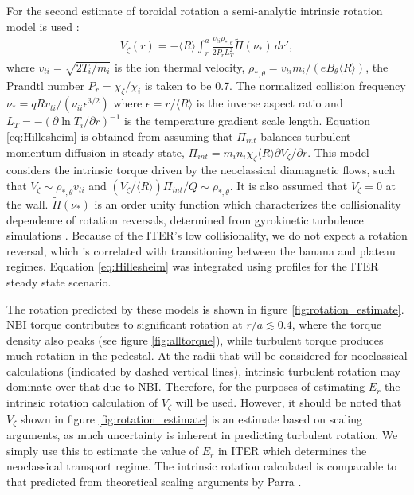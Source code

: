 \documentclass{article}
\numberwithin{figure}{section}
\numberwithin{equation}{section}
\begin{document}
For the second estimate of toroidal rotation a semi-analytic intrinsic rotation model is used \cite{Hillesheim2015}:
\begin{gather}
V_{\zeta}(r) = - \langle R \rangle \int_{r}^a \frac{v_{ti} \rho_{*,\theta}} {2 P_r L_T^2} \widetilde{\Pi} (\nu_*) \, d r',
\label{eq:Hillesheim}
\end{gather} 
where $v_{ti} = \sqrt{2T_i/m_i}$ is the ion thermal velocity, $\rho_{*,\theta} = v_{ti} m_i/(e B_{\theta} \langle R \rangle) $, the Prandtl number $P_r = \chi_{\zeta}/\chi_i$ is taken to be 0.7. The normalized collision frequency $\nu_* = q R v_{ti}/(\nu_{ii} \epsilon^{3/2})$ where $\epsilon = r/\langle R \rangle$ is the inverse aspect ratio and $L_T = - \left( \partial \ln T_i/ \partial r \right)^{-1}$ is the temperature gradient scale length. Equation \ref{eq:Hillesheim} is obtained from assuming that $\Pi_{int}$ balances turbulent momentum diffusion in steady state, $\Pi_{int} = m_i n_i \chi_{\zeta} \langle R \rangle \partial V_{\zeta}/\partial r$. This model considers the intrinsic torque driven by the neoclassical diamagnetic flows, such that $V_{\zeta} \sim \rho_{*,\theta} v_{ti}$ and $(V_{\zeta}/\langle R \rangle) \Pi_{int}/Q \sim \rho_{*, \theta}$. It is also assumed that $V_{\zeta} = 0$ at the wall. %
$\widetilde{\Pi} (\nu_*)$ is an order unity function which characterizes the collisionality dependence of rotation reversals, determined from gyrokinetic turbulence simulations \cite{Barnes2013}. Because of the ITER's low collisionality, we do not expect a rotation reversal, which is correlated with transitioning between the banana and plateau regimes. Equation \ref{eq:Hillesheim} was integrated using profiles for the ITER steady state scenario. 

The rotation predicted by these models is shown in figure \ref{fig:rotation_estimate}. NBI torque contributes to significant rotation at $r/a \lesssim 0.4$, where the torque density also peaks (see figure \ref{fig:alltorque}), while turbulent torque produces much rotation in the pedestal.  At the radii that will be considered for neoclassical calculations (indicated by dashed vertical lines), intrinsic turbulent rotation may dominate over that due to NBI. Therefore, for the purposes of estimating $E_r$ the intrinsic rotation calculation of $V_{\zeta}$ will be used. However, it should be noted that $V_{\zeta}$ shown in figure \ref{fig:rotation_estimate} is an estimate based on scaling arguments, as much uncertainty is inherent in predicting turbulent rotation. We simply use this to estimate the value of $E_r$ in ITER which determines the neoclassical transport regime. The intrinsic rotation calculated is comparable to that predicted from theoretical scaling arguments by Parra  \cite{Parra2012}. 
\FloatBarrier
\end{document}

